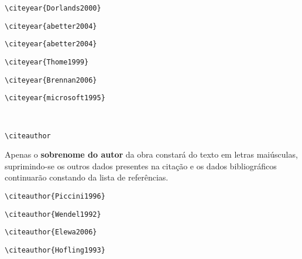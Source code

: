 \begin{alineas}
\begin{verbatim}
\citeyear{Dorlands2000}
\end{verbatim}
\citeyear{Dorlands2000}

\begin{verbatim}
\citeyear{abetter2004}
\end{verbatim}
\citeyear{abetter2004}

\begin{verbatim}
\citeyear{abetter2004}
\end{verbatim}
\citeyear{council2001}

\begin{verbatim}
\citeyear{Thome1999}
\end{verbatim}
\citeyear{Thome1999}


\begin{verbatim}
\citeyear{Brennan2006}
\end{verbatim}
\citeyear{Brennan2006}

\begin{verbatim}
\citeyear{microsoft1995}
\end{verbatim}
\citeyear{microsoft1995}\\

\item
\begin{verbatim}
\citeauthor
\end{verbatim}

Apenas o \textbf{sobrenome do autor} da obra constar\'a do texto em letras mai\'usculas, suprimindo-se os outros dados presentes na cita\c{c}\~ao e os dados bibliogr\'aficos continuar\~ao constando da lista de refer\^encias. 

{\tiny {\tiny }}\begin{verbatim}
\citeauthor{Piccini1996} 
\end{verbatim}
\citeauthor{Piccini1996} 

\begin{verbatim}
\citeauthor{Wendel1992}
\end{verbatim}
\citeauthor{Wendel1992}

\begin{verbatim}
\citeauthor{Elewa2006}
\end{verbatim}
\citeauthor{Elewa2006}

\begin{verbatim}
\citeauthor{Hofling1993}
\end{verbatim}
\citeauthor{Hofling1993}



\end{alineas}
